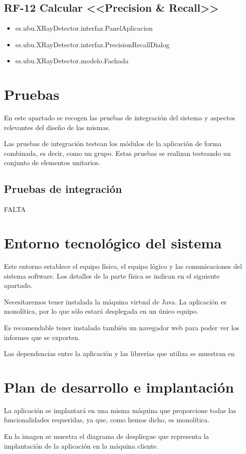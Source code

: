 \subsection{RF-12 Calcular <<Precision \& Recall>>}
\begin{itemize}
\item[] es.ubu.XRayDetector.interfaz.PanelAplicacion
\item[] es.ubu.XRayDetector.interfaz.PrecisionRecallDialog
\item[] es.ubu.XRayDetector.modelo.Fachada
\end{itemize}

\section{Pruebas}
En este apartado se recogen las pruebas de integración del sistema y aspectos relevantes del diseño de las mismas.

Las pruebas de integración testean los módulos de la aplicación de forma combinada, es decir, como un grupo. Estas pruebas se realizan testeando un conjunto de elementos unitarios.

\subsection{Pruebas de integración}
FALTA

\newpage

\section{Entorno tecnológico del sistema}
Este entorno establece el equipo físico, el equipo lógico y las comunicaciones del sistema software. Los detalles de la parte física se indican en el siguiente apartado.

Necesitaremos tener instalada la máquina virtual de Java. La aplicación es monolítica, por lo que sólo estará desplegada en un único equipo.

Es recomendable tener instalado también un navegador web para poder ver los informes que se exporten.

Las dependencias entre la aplicación y las librerías que utiliza se muestran en 




\section{Plan de desarrollo e implantación}
La aplicación se implantará en una misma máquina que proporcione todas las funcionalidades requeridas, ya que, como hemos dicho, es monolítica.

En la imagen  se muestra el diagrama de despliegue que representa la implantación de la aplicación en la máquina cliente.

